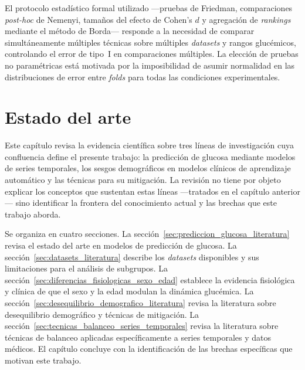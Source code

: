El protocolo estadístico formal utilizado —pruebas de Friedman, comparaciones \emph{post-hoc} de Nemenyi, tamaños del efecto de Cohen's $d$ y agregación de \emph{rankings} mediante el método de Borda— responde a la necesidad de comparar simultáneamente múltiples técnicas sobre múltiples \emph{datasets} y rangos glucémicos, controlando el error de tipo~I en comparaciones múltiples. La elección de pruebas no paramétricas está motivada por la imposibilidad de asumir normalidad en las distribuciones de error entre \emph{folds} para todas las condiciones experimentales.

\label{chapter:estado-arte}
\chapter[Estado del arte]{Estado del arte}

Este capítulo revisa la evidencia científica sobre tres líneas de investigación cuya confluencia define el presente trabajo: la predicción de glucosa mediante modelos de series temporales, los sesgos demográficos en modelos clínicos de aprendizaje automático y las técnicas para su mitigación. La revisión no tiene por objeto explicar los conceptos que sustentan estas líneas —tratados en el capítulo anterior— sino identificar la frontera del conocimiento actual y las brechas que este trabajo aborda.

Se organiza en cuatro secciones. La sección~\ref{sec:prediccion_glucosa_literatura} revisa el estado del arte en modelos de predicción de glucosa. La sección~\ref{sec:datasets_literatura} describe los \emph{datasets} disponibles y sus limitaciones para el análisis de subgrupos. La sección~\ref{sec:diferencias_fisiologicas_sexo_edad} establece la evidencia fisiológica y clínica de que el sexo y la edad modulan la dinámica glucémica. La sección~\ref{sec:desequilibrio_demografico_literatura} revisa la literatura sobre desequilibrio demográfico y técnicas de mitigación. La sección~\ref{sec:tecnicas_balanceo_series_temporales} revisa la literatura sobre técnicas de balanceo aplicadas específicamente a series temporales y datos médicos. El capítulo concluye con la identificación de las brechas específicas que motivan este trabajo.

